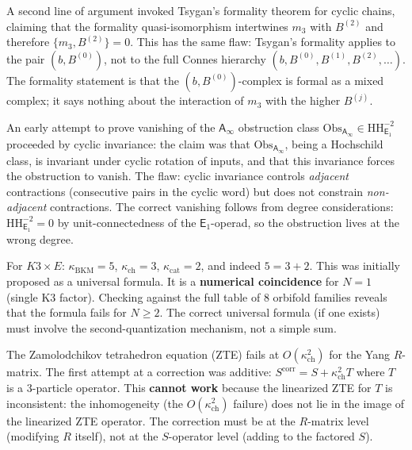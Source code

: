 \documentclass[11pt]{article}
\newcommand{\Eone}{\mathsf{E}_1}
\newcommand{\Ainf}{\mathsf{A}_{\infty}}
\newcommand{\HH}{\mathrm{HH}}
\begin{document}
\begin{warning}
\label{warn:dead-end-tsygan}
A second line of argument invoked Tsygan's formality theorem for cyclic
chains, claiming that the formality quasi-isomorphism intertwines $m_3$
with $B^{(2)}$ and therefore $\{m_3, B^{(2)}\} = 0$. This has the
same flaw: Tsygan's formality applies to the pair $(b, B^{(0)})$, not
to the full Connes hierarchy $(b, B^{(0)}, B^{(1)}, B^{(2)}, \ldots)$.
The formality statement is that the $(b, B^{(0)})$-complex is formal
as a mixed complex; it says nothing about the interaction of $m_3$
with the higher $B^{(j)}$.
\end{warning}

\begin{warning}[Dead end 3: cyclic invariance ``proof'' of $\mathrm{Obs}_{\Ainf} = 0$]
\label{warn:dead-end-cyclic}
An early attempt to prove vanishing of the $\Ainf$ obstruction class
$\mathrm{Obs}_{\Ainf} \in \HH^{-2}_{\Eone}$ proceeded by cyclic
invariance: the claim was that $\mathrm{Obs}_{\Ainf}$, being a
Hochschild class, is invariant under cyclic rotation of inputs, and
that this invariance forces the obstruction to vanish. The flaw:
cyclic invariance controls \emph{adjacent} contractions (consecutive
pairs in the cyclic word) but does not constrain \emph{non-adjacent}
contractions. The correct vanishing follows from degree considerations:
$\HH^{-2}_{\Eone} = 0$ by unit-connectedness of the $\Eone$-operad,
so the obstruction lives at the wrong degree.
\end{warning}

\begin{observation}[Dead end 4: $\kappa_{\mathrm{BKM}} = \kappa_{\mathrm{ch}} + \kappa_{\mathrm{cat}}$]
\label{obs:dead-end-kappa-sum}
For $K3 \times E$: $\kappa_{\mathrm{BKM}} = 5$, $\kappa_{\mathrm{ch}} = 3$,
$\kappa_{\mathrm{cat}} = 2$, and indeed $5 = 3 + 2$. This was initially
proposed as a universal formula. It is a \textbf{numerical coincidence}
for $N = 1$ (single K3 factor). Checking against the full table of
$8$ orbifold families reveals that the formula fails for $N \geq 2$.
The correct universal formula (if one exists) must involve the
second-quantization mechanism, not a simple sum.
\end{observation}

\begin{warning}
\label{warn:dead-end-zte-additive}
The Zamolodchikov tetrahedron equation (ZTE) fails at $O(\kappa_{\mathrm{ch}}^2)$ for
the Yang $R$-matrix. The first attempt at a correction was additive:
$S^{\mathrm{corr}} = S + \kappa_{\mathrm{ch}}^2 T$ where $T$ is a $3$-particle
operator. This \textbf{cannot work} because the linearized ZTE for $T$
is inconsistent: the inhomogeneity (the $O(\kappa_{\mathrm{ch}}^2)$ failure) does not
lie in the image of the linearized ZTE operator. The correction must
be at the $R$-matrix level (modifying $R$ itself), not at the
$S$-operator level (adding to the factored $S$).
\end{warning}
\end{document}
